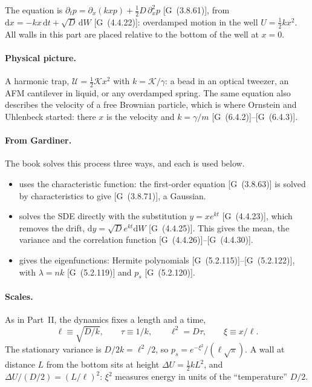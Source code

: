 \documentclass[11pt]{article}
\numberwithin{equation}{section}
\newcommand{\dd}{\mathrm{d}}
\newcommand{\G}[1]{[G~(#1)]}
\newcommand{\Gs}[1]{[G~\S#1]}
\begin{document}
The equation is $\partial_tp=\partial_x(kxp)+\tfrac12D\,\partial_x^2p$ \G{3.8.61}, from
$\dd x=-kx\,\dd t+\sqrt D\,\dd W$ \G{4.4.22}: overdamped motion in the well $U=\tfrac12kx^2$. All walls in this
part are placed relative to the bottom of the well at $x=0$.

\paragraph{Physical picture.} A harmonic trap, $\mathcal U=\tfrac12\mathcal Kx^2$ with $k=\mathcal K/\gamma$: a bead in
an optical tweezer, an AFM cantilever in liquid, or any overdamped spring. The same equation also describes the
velocity of a free Brownian particle, which is where Ornstein and Uhlenbeck started: there $x$ is the velocity and
$k=\gamma/m$ \G{6.4.2}--\G{6.4.3}.

\paragraph{From Gardiner.} The book solves this process three ways, and each is used below.
\begin{itemize}
  \item \Gs{3.8.4} uses the characteristic function: the first-order equation \G{3.8.63} is solved by
        characteristics to give \G{3.8.71}, a Gaussian.
  \item \Gs{4.4.4} solves the SDE directly with the substitution $y=xe^{kt}$ \G{4.4.23}, which removes the
        drift, $\dd y=\sqrt De^{kt}\dd W$ \G{4.4.25}. This gives the mean, the variance and the correlation
        function \G{4.4.26}--\G{4.4.30}.
  \item \Gs{5.2.6c} gives the eigenfunctions: Hermite polynomials \G{5.2.115}--\G{5.2.122}, with $\lambda=nk$
        \G{5.2.119} and $p_s$ \G{5.2.120}.
\end{itemize}

\paragraph{Scales.} As in Part~II, the dynamics fixes a length and a time,
\begin{equation}
  \ell\equiv\sqrt{D/k},\qquad \tau\equiv1/k,\qquad \ell^2=D\tau,\qquad \xi\equiv x/\ell .
  \label{eq:ou-scales}
\end{equation}
The stationary variance is $D/2k=\ell^2/2$, so $p_s=e^{-\xi^2}/(\ell\sqrt\pi)$. A wall at distance $L$ from the
bottom sits at height $\Delta U=\tfrac12kL^2$, and $\Delta U/(D/2)=(L/\ell)^2$: $\xi^2$ measures energy in
units of the ``temperature'' $D/2$.
\end{document}
